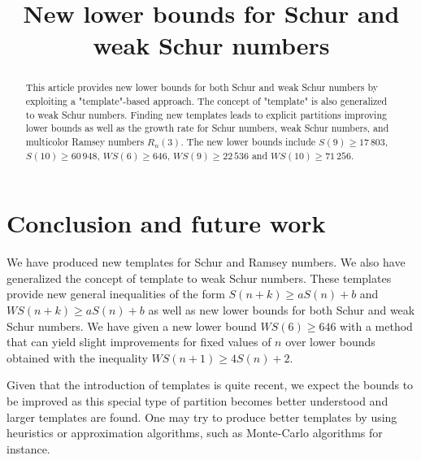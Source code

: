 \documentclass[review,onefignum,onetabnum]{siamart190516}
\title{New lower bounds for Schur and weak Schur numbers}
\newcommand{\WS}{\mathit{WS}}
\begin{document}
\begin{abstract}

This article provides new lower bounds for both Schur and weak Schur numbers by exploiting a "template"-based approach. 
The concept of "template" is also generalized to weak Schur numbers. Finding new templates leads to explicit partitions 
improving lower bounds as well as the growth rate for Schur numbers, weak Schur numbers, and multicolor Ramsey numbers \(R_n(3)\). 
The new lower bounds include \(S(9) \geqslant 17\,803\), \(S(10) \geqslant 60\,948\), \(\WS(6) \geqslant 646\), 
\(\WS (9) \geqslant 22\,536\) and \(\WS (10) \geqslant 71\,256 \).

\end{abstract}


\maketitle







\section{Conclusion and future work}

We have produced new templates for Schur and Ramsey numbers. We also have generalized the concept of template to weak Schur numbers. 
These templates provide new general inequalities of the form \(S(n+k) \geqslant a S(n) + b\) and \(\WS(n+k) \geqslant a S(n) + b\) 
as well as new lower bounds for both Schur and weak Schur numbers. We have given a new lower bound \(\WS(6) \geqslant 646\) with 
a method that can yield slight improvements for fixed values of \(n\) over lower bounds obtained with the inequality 
\(\WS(n+1) \geqslant 4 S(n) + 2\).

Given that the introduction of templates is quite recent, we expect the bounds to be improved as this special type of partition 
becomes better understood and larger templates are found. One may try to produce better templates by using heuristics or 
approximation algorithms, such as Monte-Carlo algorithms for instance.
\end{document}
